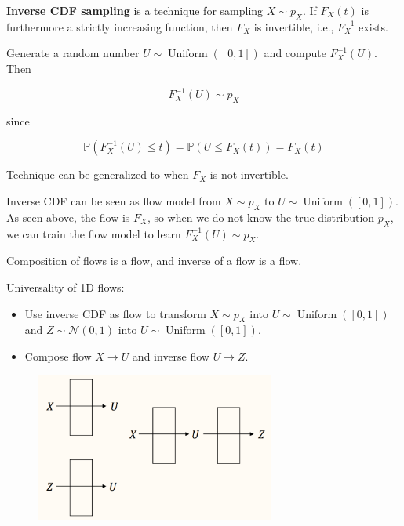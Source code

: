 \begin{concept}
    \textbf{Inverse CDF sampling} is a technique for sampling $X \sim p_{X}$.
    If $F_{X}(t)$ is furthermore a strictly increasing function, then $F_{X}$ is invertible, i.e., $F_{X}^{-1}$ exists.

    Generate a random number $U \sim \operatorname{Uniform}([0,1])$ and compute $F_{X}^{-1}(U)$. Then

    $$
    F_{X}^{-1}(U) \sim p_{X}
    $$

    since

    $$
    \mathbb{P}\left(F_{X}^{-1}(U) \leq t\right)=\mathbb{P}\left(U \leq F_{X}(t)\right)=F_{X}(t)
    $$

    Technique can be generalized to when $F_{X}$ is not invertible.

    \par\noindent\textcolor{gray}{\hdashrule{\textwidth}{0.4pt}{1pt 2pt}}

    Inverse CDF can be seen as flow model from $X \sim p_X$ to $U \sim \operatorname{Uniform}([0,1])$.
    As seen above, the flow is $F_X$, so when we do not know the true distribution $p_X$, we can train the flow model to learn $F_{X}^{-1}(U) \sim p_{X}$.
\end{concept}

\begin{concept}
    Composition of flows is a flow, and inverse of a flow is a flow.

    Universality of 1D flows:

    \begin{itemize}
        \item Use inverse CDF as flow to transform $X \sim p_{X}$ into $U \sim \operatorname{Uniform}([0,1])$ and $Z \sim \mathcal{N}(0,1)$ into $U \sim \operatorname{Uniform}([0,1])$.
        \item Compose flow $X \rightarrow U$ and inverse flow $U \rightarrow Z$.
    \end{itemize}

    \begin{figure}[H]
        \centering
        \includegraphics[width=0.7\textwidth]{.././assets/10.11.png}
    \end{figure}
\end{concept}

